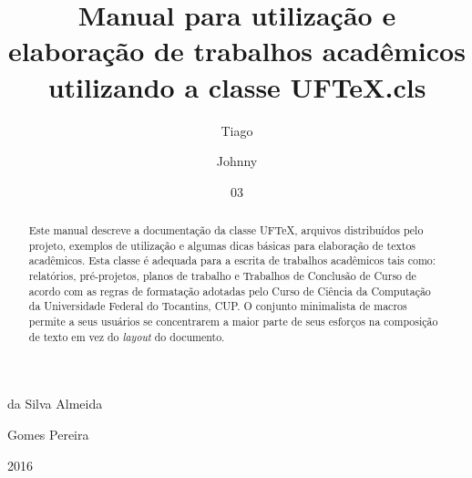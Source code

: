 \documentclass[report]{uftex}
\newcommand\uftex{UF\TeX}
\begin{document}
  \title{Manual para utilização e elaboração de trabalhos acadêmicos utilizando a classe \uftex .cls}
  \author{Tiago}{da Silva Almeida}
  \author{Johnny}{Gomes Pereira}
  \date{03}{2016}
  \keyword{\LaTeX}
  \keyword{\uftex}
  \foreignkeyword{\LaTeX}
  \foreignkeyword{\uftex}
  \maketitle
  \frontmatter
  \begin{abstract}
Este manual descreve a documentação da classe \uftex, arquivos distribuídos pelo projeto, exemplos de utilização e algumas dicas básicas para elaboração de textos acadêmicos. Esta classe é adequada para a escrita de trabalhos acadêmicos tais como: relatórios, pré-projetos, planos de trabalho e Trabalhos de Conclusão de Curso de acordo com as regras de formatação adotadas pelo Curso de Ciência da Computação da Universidade Federal do Tocantins, CUP. O conjunto minimalista de macros permite a seus usuários se concentrarem a maior parte de seus esforços na composição de texto em vez do \emph{layout} do documento.
  \end{abstract}
\end{document}
